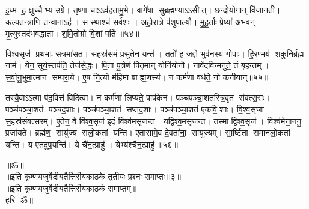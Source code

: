    इ॒ध्म ह॒ क्षुच्चैभ्य उ॒ग्रे।
   तृ॒ष्णा चाऽऽव॑हतामु॒भे।
   वागे॑षा सुब्रह्म॒ण्याऽऽसीत्।
   छ॒न्दो॒यो॒गान् वि॑जान॒ती।
   क॒ल्प॒त॒न्त्राणि॑ तन्वा॒नाऽह॑।
   स॒स्थाश्च॑ सर्व॒शः ।
   अ॒हो॒रा॒त्रे प॑शुपा॒ल्यौ।
   मु॒हू॒र्ताः प्रे॒ष्या॑ अभवन्।
   मृ॒त्युस्तद॑भवद्धा॒ता।
   श॒मि॒तोग्रो वि॒शां पति॑॥५४॥

   वि॒श्व॒सृज॑ प्रथ॒माः स॒त्रमा॑सत।
   स॒हस्र॑समं॒ प्रसु॑तेन॒ यन्त॑।
   ततो॑ ह जज्ञे॒ भुव॑नस्य गो॒पाः।
   हि॒र॒ण्मय॑ श॒कुनि॒र्ब्रह्म॒ नाम॑।
   येन॒ सूर्य॒स्तप॑ति॒ तेज॑से॒द्धः।
   पि॒ता पु॒त्रेण॑ पितृ॒मान् योनि॑योनौ।
   नावे॑दविन्मनुते॒ तं बृ॒हन्तम्।
   स॒र्वा॒नु॒भुमा॒त्मान सम्परा॒ये।
   ए॒ष नि॒त्यो म॑हि॒मा ब्राह्म॒णस्य॑।
   न कर्म॑णा वर्धते॒ नो कनी॑यान्॥५५॥

   तस्यै॒वाऽऽत्मा प॑द॒वित्तं वि॑दित्वा।
   न कर्म॑णा लिप्यते॒ पाप॑केन।
   पञ्च॑पञ्चा॒शत॑स्त्रि॒वृत॑ संवत्स॒राः।
   पञ्च॑पञ्चा॒शत॑ पञ्चद॒शाः।
   पञ्च॑पञ्चा॒शत॑ सप्तद॒शाः।
   पञ्च॑पञ्चा॒शत॑ एकवि॒शाः।
   वि॒श्व॒सृजा स॒हस्र॑संवत्सरम्।
   ए॒तेन॒ वै वि॑श्व॒सृज॑ इ॒दं विश्व॑मसृजन्त।
   यद्विश्व॒मसृ॑जन्त।
   तस्माद्विश्व॒सृज॑।
   विश्व॑मेना॒ननु॒ प्रजा॑यते।
   ब्रह्म॑ण॒ सायु॑ज्य सलो॒कतां यन्ति।
   ए॒तासा॑मे॒व दे॒वता॑ना॒ सायु॑ज्यम्।
   सा॒र्ष्टिता समानलो॒कतां यन्ति।
   य ए॒तदु॑प॒यन्ति॑।
   ये चै॑न॒त्प्राहु॑।
   येभ्य॑श्चैन॒त्प्राहु॑॥५६॥
   \anuvakamend

      \begin{center}
  ॥ॐ॥\\
॥इति कृष्णयजुर्वेदीयतैत्तिरीयकाठके तृतीयः प्रश्नः समाप्तः॥३॥\\
॥इति कृष्णयजुर्वेदीयतैत्तिरीयकाठकं समाप्तम्॥\\
   हरि॑  ॐ॥
\end{center}
